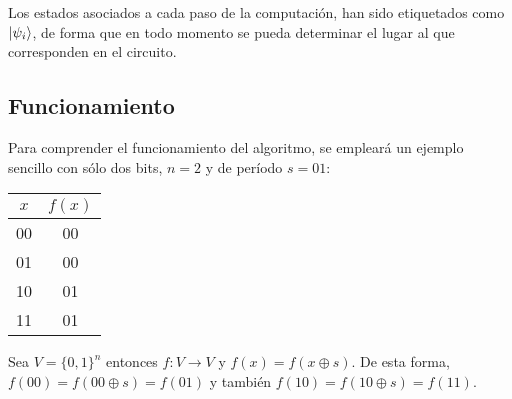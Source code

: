 Los estados asociados a cada paso de la computación, han sido etiquetados como 
$\ket{\psi_i}$, de forma que en todo momento se pueda determinar el lugar al que 
corresponden en el circuito.

\subsection{Funcionamiento}
Para comprender el funcionamiento del algoritmo, se empleará un ejemplo sencillo 
con sólo dos bits, $n=2$ y de período $s=01$:
%
\begin{center}
\begin{tabular}{|c|c|}
	\hline
	$x$ & $f(x)$ \\
	\hline
	00 & 00 \\
	01 & 00 \\
	10 & 01 \\
	11 & 01 \\
	\hline
\end{tabular}
\end{center}
%
Sea $V = \{0,1\}^n$ entonces $f:V\rightarrow V$ y $f(x) = f(x\oplus s)$. De esta 
forma, $f(00) = f(00 \oplus s) = f(01)$ y también $f(10) = f(10 \oplus s) = 
f(11)$.

